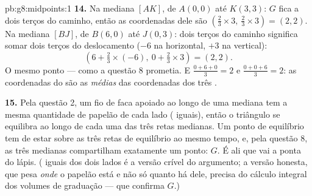 \begin{solution}{pb:g8:midpoints:1}
\textbf{14.} Na mediana $[AK]$, de $A(0,0)$ até $K(3,3)$: $G$ fica a
dois terços do caminho, então as coordenadas dele são
$\left(\frac23 \times 3,\ \frac23 \times 3\right) = (2, 2)$. Na
mediana $[BJ]$, de $B(6, 0)$ até $J(0, 3)$: dois terços do caminho
significa somar dois terços do deslocamento ($-6$ na horizontal, $+3$
na vertical):
\[
\left(6 + \tfrac23 \times (-6),\ 0 + \tfrac23 \times 3\right)
= (2, 2) .
\]
O mesmo ponto --- como a questão 8 prometia. E
$\frac{0 + 6 + 0}{3} = 2$ e $\frac{0 + 0 + 6}{3} = 2$: as coordenadas
do  são as \emph{médias} das coordenadas dos três
.

\textbf{15.} Pela questão 2, um fio de faca apoiado ao longo de uma
mediana tem a mesma quantidade de papelão de cada lado ( iguais),
então o triângulo se equilibra ao longo de cada uma das três retas
medianas. Um ponto de equilíbrio tem de estar sobre as três retas de
equilíbrio ao mesmo tempo, e, pela questão 8, as três medianas
compartilham exatamente um ponto: $G$. É ali que vai a ponta do lápis.
( iguais dos dois lados é a versão crível do argumento; a versão
honesta, que pesa \emph{onde} o papelão está e não só quanto há dele,
precisa do cálculo integral dos volumes de graduação --- que confirma
$G$.)
\end{solution}
